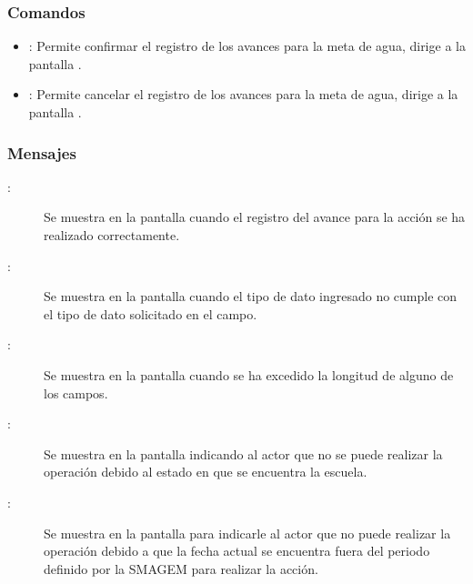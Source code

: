 \subsubsection{Comandos}
    \begin{itemize}	
	\item {}: Permite confirmar el registro de los avances para la meta de agua, dirige a la pantalla .
	\item {}: Permite cancelar el registro de los avances para la meta de agua, dirige a la pantalla .
    \end{itemize}

\subsubsection{Mensajes}

    \begin{description}
    
	    \item [:] Se muestra en la pantalla  cuando el registro del avance para la acción se ha realizado correctamente.
	    
	    \item [:] Se muestra en la pantalla  cuando el tipo de dato ingresado no cumple con el tipo de dato solicitado en el campo.
	    
	    \item [:] Se muestra en la pantalla  cuando se ha excedido la longitud de alguno de los campos.	
	    
	    \item [:] Se muestra en la pantalla  indicando al actor que no se puede realizar la operación debido al estado en que se encuentra la escuela.
	    
	    \item [:] Se muestra en la pantalla  para indicarle al actor que no puede realizar la operación debido a que la fecha actual se encuentra fuera del periodo definido por la SMAGEM para realizar la acción.
    \end{description}
